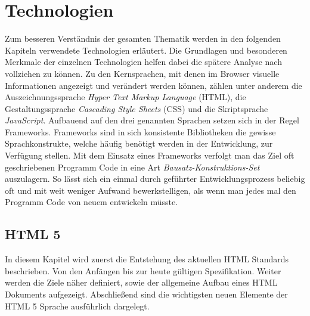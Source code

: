 \section{Technologien}\label{technologien}
Zum besseren Verständnis der gesamten Thematik werden in den folgenden Kapiteln verwendete Technologien erläutert. Die Grundlagen und besonderen Merkmale der einzelnen Technologien helfen dabei die spätere Analyse nach vollziehen zu können. Zu den Kernsprachen, mit denen im Browser visuelle Informationen angezeigt und verändert werden können, zählen unter anderem die Auszeichnungssprache \textit{Hyper Text Markup Language} (HTML), die Gestaltungssprache \textit{Cascading Style Sheets} (CSS) und die Skriptsprache \textit{JavaScript}. Aufbauend auf den drei genannten Sprachen setzen sich in der Regel Frameworks. Frameworks sind in sich konsistente Bibliotheken die gewisse Sprachkonstrukte, welche häufig benötigt werden in der Entwicklung, zur Verfügung stellen. Mit dem Einsatz eines Frameworks verfolgt man das Ziel oft geschriebenen Programm Code in eine Art \textit{Bausatz-Konstruktions-Set} auszulagern. So lässt sich ein einmal durch geführter Entwicklungsprozess beliebig oft und mit weit weniger Aufwand bewerkstelligen, als wenn man jedes mal den Programm Code von neuem entwickeln müsste.

\subsection{HTML 5}
In diesem Kapitel wird zuerst die Entstehung des aktuellen HTML Standards beschrieben. Von den Anfängen bis zur heute gültigen Spezifikation. Weiter werden die Ziele näher definiert, sowie der allgemeine Aufbau eines HTML Dokuments aufgezeigt. Abschließend sind die wichtigsten neuen Elemente der HTML 5 Sprache ausführlich dargelegt.

